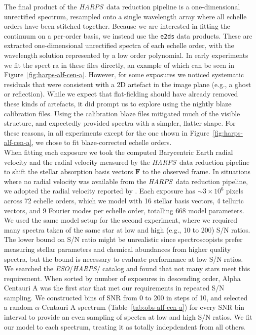 \documentclass[modern]{aastex631}
\newcommand{\project}[1]{\textit{#1}}
\renewcommand{\vec}[1]{\mathbf{#1}}
\newcommand{\eso}{\project{ESO}}
\newcommand{\harps}{\project{HARPS}}
\newcommand{\todo}[1]{\textcolor{tab:red}{#1}}
\begin{document}
The final product of the \harps\ data reduction pipeline is a one-dimensional unrectified spectrum, resampled onto a single wavelength array where all echelle orders have been stitched together. Because we are interested in fitting the continuum on a per-order basis, we instead use the \texttt{e2ds} data products. These are extracted one-dimensional unrectified spectra of each echelle order, with the wavelength solution represented by a low order polynomial. In early experiments we fit the spect ra in these files directly, an example of which can be seen in Figure~\ref{fig:harps-alf-cen-a}. However, for some exposures we noticed systematic residuals that were consistent with a 2D artefact in the image plane (e.g., a ghost or reflection). While we expect that flat-fielding should have already removed these kinds of artefacts, it did prompt us to explore using the nightly blaze calibration files. Using the calibration blaze files mitigated much of the visible structure, and expectedly provided spectra with a simpler, flatter shape. For these reasons, in all experiments except for the one shown in Figure~\ref{fig:harps-alf-cen-a}, we chose to fit blaze-corrected echelle orders.\\

When fitting each exposure we took the computed Barycentric Earth radial velocity and the radial velocity measured by the \harps\ data reduction pipeline to shift the stellar absorption basis vectors $\vec{F}$ to the observed frame. In situations where no radial velocity was available from the \harps\ data reduction pipeline, we adopted the radial velocity reported by \citep{Someone}. Each exposure has $\sim3\times10^6$ pixels across 72 echelle orders, which we model with 16 stellar basis vectors, 4 telluric vectors, and \todo{9} Fourier modes per echelle order, totalling \todo{668} model parameters.\\

We used the same model setup for the second experiment, where we required many spectra taken of the same star at low and high (e.g., 10 to 200) S/N ratios. The lower bound on S/N ratio might be unrealistic since spectroscopists prefer measuring stellar parameters and chemical abundances from higher quality spectra, but the bound is necessary to evaluate performance at low S/N ratios. We searched the \eso/\harps/ catalog and found that not many stars meet this requirement. When sorted by number of exposures in descending order, Alpha Centauri A was the first star that met our requirements in repeated S/N sampling. We constructed bins of SNR from 0 to 200 in steps of 10, and selected a random $\alpha$-Centauri A spectrum (Table~\ref{tab:obs-alf-cen-a}) for every SNR bin interval to provide an even sampling of spectra at low and high S/N ratios. We fit our model to each spectrum, treating it as totally indepdendent from all others.\\
\end{document}
